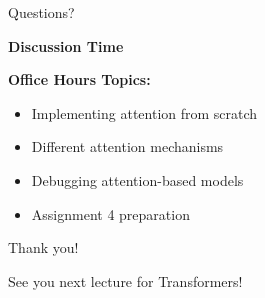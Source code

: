\documentclass[aspectratio=169]{beamer}
\begin{document}
\begin{frame}{Questions? 🙋}
\begin{center}
\LARGE
\textbf{Discussion Time}
\end{center}

\vspace{1em}

\textbf{Office Hours Topics:}
\begin{itemize}\setlength{\itemsep}{0pt}
    \item Implementing attention from scratch
    \item Different attention mechanisms
    \item Debugging attention-based models
    \item Assignment 4 preparation
\end{itemize}

\vspace{1em}

\begin{center}
\Large
Thank you! 🙏

\vspace{1em}

See you next lecture for Transformers!
\end{center}
\end{frame}
\end{document}
